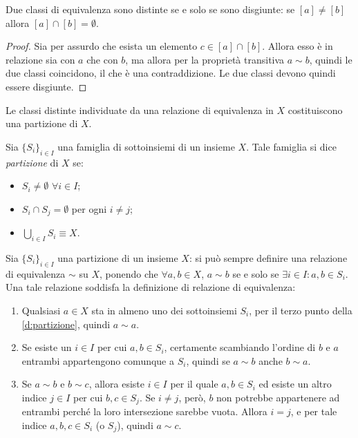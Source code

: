 \begin{teorema}
	Due classi di equivalenza sono distinte se e solo se sono disgiunte: se $[a]\neq[b]$ allora $[a]\cap[b]=\emptyset$.
\end{teorema}
\begin{proof}
	Sia per assurdo che esista un elemento $c\in[a]\cap[b]$.
	Allora esso è in relazione sia con $a$ che con $b$, ma allora per la proprietà transitiva $a\sim b$, quindi le due classi coincidono, il che è una contraddizione.
	Le due classi devono quindi essere disgiunte.
\end{proof}

Le classi distinte individuate da una relazione di equivalenza in $X$ costituiscono una partizione di $X$.
\begin{definizione} \label{d:partizione}
	Sia $\{S_i\}_{i\in I}$ una famiglia di sottoinsiemi di un insieme $X$. Tale famiglia si dice \emph{partizione} di $X$ se:
	\begin{itemize}
		\item $S_i\neq\emptyset$ $\forall i\in I$;
		\item $S_i\cap S_j=\emptyset$ per ogni $i\neq j$;
		\item $\bigcup_{i\in I}S_i\equiv X$.
	\end{itemize}
\end{definizione}
Sia $\{S_i\}_{i\in I}$ una partizione di un insieme $X$: si può sempre definire una relazione di equivalenza $\sim$ su $X$, ponendo che $\forall a,b\in X$, $a\sim b$ se e solo se $\exists i\in I\colon a,b\in S_i$.
Una tale relazione soddisfa la definizione di relazione di equivalenza:
\begin{enumerate}
	\item Qualsiasi $a\in X$ sta in almeno uno dei sottoinsiemi $S_i$, per il terzo punto della \ref{d:partizione}, quindi $a\sim a$.
	\item Se esiste un $i\in I$ per cui $a,b\in S_i$, certamente scambiando l'ordine di $b$ e $a$ entrambi appartengono comunque a $S_i$, quindi se $a\sim b$ anche $b\sim a$.
	\item Se $a\sim b$ e $b\sim c$, allora esiste $i\in I$ per il quale $a,b\in S_i$ ed esiste un altro indice $j\in I$ per cui $b,c\in S_j$.
		Se $i\neq j$, però, $b$ non potrebbe appartenere ad entrambi perché la loro intersezione sarebbe vuota.
		Allora $i=j$, e per tale indice $a,b,c\in S_i$ (o $S_j$), quindi $a\sim c$.
\end{enumerate}



